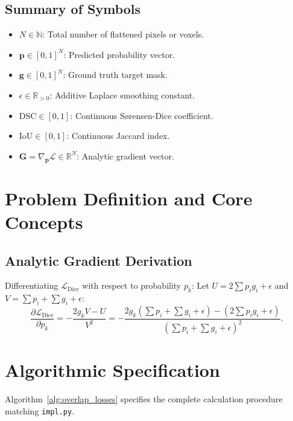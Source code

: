 \documentclass[11pt]{article}
\begin{document}
\subsection{Summary of Symbols}
\begin{itemize}
    \item $N \in \mathbb{N}$: Total number of flattened pixels or voxels.
    \item $\mathbf{p} \in [0, 1]^N$: Predicted probability vector.
    \item $\mathbf{g} \in [0, 1]^N$: Ground truth target mask.
    \item $\epsilon \in \mathbb{R}_{>0}$: Additive Laplace smoothing constant.
    \item $\mathrm{DSC} \in [0, 1]$: Continuous S{\o}rensen-Dice coefficient.
    \item $\mathrm{IoU} \in [0, 1]$: Continuous Jaccard index.
    \item $\mathbf{G} = \nabla_{\mathbf{p}} \mathcal{L} \in \mathbb{R}^N$: Analytic gradient vector.
\end{itemize}

\section{Problem Definition and Core Concepts}
\label{sec:problem_definition}

\subsection{Analytic Gradient Derivation}
Differentiating $\mathcal{L}_{\mathrm{Dice}}$ with respect to probability $p_k$:
Let $U = 2 \sum p_i g_i + \epsilon$ and $V = \sum p_i + \sum g_i + \epsilon$:
\begin{equation}
\frac{\partial \mathcal{L}_{\mathrm{Dice}}}{\partial p_k} = -\frac{2 g_k V - U}{V^2} = -\frac{2 g_k \left(\sum p_i + \sum g_i + \epsilon\right) - \left(2 \sum p_i g_i + \epsilon\right)}{\left(\sum p_i + \sum g_i + \epsilon\right)^2}.
\end{equation}

\section{Algorithmic Specification}
\label{sec:algorithm}

Algorithm~\ref{alg:overlap_losses} specifies the complete calculation procedure matching \texttt{impl.py}.
\end{document}

